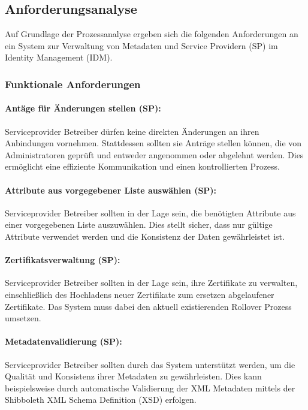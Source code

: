 \documentclass[a4paper, fontsize=11pt]{scrartcl}
\begin{document}
\subsection{Anforderungsanalyse}\label{subsec:anforderungsanalyse-results}
Auf Grundlage der Prozessanalyse ergeben sich die folgenden Anforderungen an ein System zur Verwaltung von Metadaten und Service Providern (SP) im Identity Management (IDM).

\subsubsection{Funktionale Anforderungen}\label{subsubsec:functional-requirements}

\paragraph{Antäge für Änderungen stellen (SP):}
Serviceprovider Betreiber dürfen keine direkten Änderungen an ihren Anbindungen vornehmen.
Stattdessen sollten sie Anträge stellen können, die von Administratoren geprüft und entweder angenommen oder abgelehnt werden.
Dies ermöglicht eine effiziente Kommunikation und einen kontrollierten Prozess.

\paragraph{Attribute aus vorgegebener Liste auswählen (SP):}
Serviceprovider Betreiber sollten in der Lage sein, die benötigten Attribute aus einer vorgegebenen Liste auszuwählen.
Dies stellt sicher, dass nur gültige Attribute verwendet werden und die Konsistenz der Daten gewährleistet ist.

\paragraph{Zertifikatsverwaltung (SP):}
Serviceprovider Betreiber sollten in der Lage sein, ihre Zertifikate zu verwalten, einschließlich des Hochladens neuer Zertifikate zum ersetzen abgelaufener Zertifikate.
Das System muss dabei den aktuell existierenden Rollover Prozess umsetzen.

\paragraph{Metadatenvalidierung (SP):}
Serviceprovider Betreiber sollten durch das System unterstützt werden, um die Qualität und Konsistenz ihrer Metadaten zu gewährleisten.
Dies kann beispielsweise durch automatische Validierung der XML Metadaten mittels der Shibboleth XML Schema Definition (XSD) erfolgen.
\end{document}
